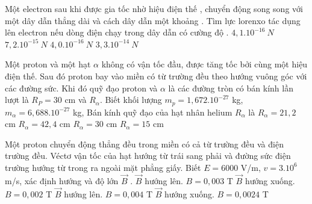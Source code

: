 \begin{vidu} %
Một electron sau khi được gia tốc nhờ hiệu điện thế , chuyển động song song với một dây dẫn thẳng dài và cách dây dẫn một khoảng . Tìm lực lorenxo tác dụng lên electron nếu dòng điện chạy trong dây dẫn có cường độ .
\choice
{\True $4,1.10^{-16}\ N$}
{$7,2.10^{-15}\ N$}
{$4,0.10^{-16}\ N$}
{$3,3.10^{-14}\ N$}
\end{vidu}
\begin{vidu} %
	Một proton và một hạt $\alpha$ không có vận tốc đầu, được tăng tốc bởi cùng một hiệu điện thế. Sau đó proton bay vào miền có từ trường đều theo hướng vuông góc với các đường sức. Khi đó quỹ đạo proton và $\alpha$ là các đường tròn có bán kính lần lượt là $R_P = 30$ cm và $R_\alpha$. Biết khối lượng $m_p = 1,672. 10^{-27}$ kg, $m_\alpha = 6,688. 10^{-27}$ kg, Bán kính quỹ đạo của hạt nhân helium $R_\alpha$ là
	\choice
	{$R_\alpha = 21,2$ cm}
	{\True $R_\alpha = 42,4$ cm}
	{$R_\alpha = 30$ cm}
	{$R_\alpha = 15$ cm}
\end{vidu}
\begin{vidu} %
	Một proton chuyển động thẳng đều trong miền có cả từ trường đều và điện trường đều. Véctơ vận tốc của hạt hướng từ trái sang phải và đường sức điện trường hướng từ trong ra ngoài mặt phẳng giấy. Biết $E = 6000$ V/m, $v = 3.10^6$ m/s, xác định hướng và độ lớn $\vec{B}$ .
	\choice
	{$\vec{B}$ hướng lên. $B = 0,003$ T}
	{\True $\vec{B}$ hướng xuống. $B = 0,002$ T}
	{$\vec{B}$ hướng lên. $B = 0,004$ T}
	{$\vec{B}$ hướng xuống. $B = 0,0024$ T}
\end{vidu}
